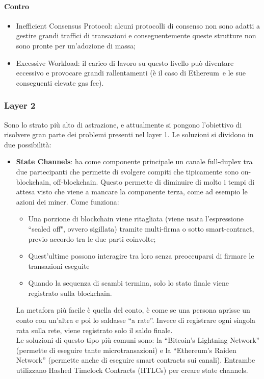     \paragraph{Contro}
    \begin{itemize}
        \item Inefficient Consensus Protocol: alcuni protocolli di consenso non sono adatti a gestire grandi traffici di transazioni e conseguentemente queste strutture non sono pronte per un'adozione di massa;
        \item Excessive Workload: il carico di lavoro su questo livello può diventare eccessivo e provocare grandi rallentamenti (è il caso di Ethereum\glo\ e le sue conseguenti
        elevate gas fee).        
    \end{itemize}

    \subsubsection{Layer 2}
    Sono lo strato più alto di astrazione, e attualmente si pongono l'obiettivo di risolvere gran parte dei problemi presenti nel layer 1. Le soluzioni si dividono in due possibilità:
    \begin{itemize}
        \item \textbf{State Channels}: ha come componente principale un canale full-duplex tra due partecipanti che permette di svolgere compiti che tipicamente sono on-blockchain, off-blockchain. 
        Questo permette di diminuire di molto i tempi di attesa visto che viene a mancare la componente terza, come ad esempio le azioni dei miner\glo.
        Come funziona:
        \begin{itemize}
            \item Una porzione di blockchain viene ritagliata (viene usata l’espressione “sealed off", ovvero sigillata) tramite multi-firma o sotto smart-contract, previo accordo tra le due parti coinvolte;
            \item Quest’ultime possono interagire tra loro senza preoccuparsi di firmare le transazioni eseguite
            \item Quando la sequenza di scambi termina, solo lo stato finale viene registrato sulla blockchain.
        \end{itemize}
        La metafora più facile è quella del conto, è come se una persona aprisse un conto con un’altra e poi lo saldasse “a rate”. Invece di registrare ogni singola rata sulla rete, viene 
        registrato solo il saldo finale.\\
        Le soluzioni di questo tipo più comuni sono: la “Bitcoin’s Lightning Network” (permette di eseguire tante microtransazioni) e la “Ethereum’s Raiden Network” (permette anche di eseguire smart contracts 
        sui canali). Entrambe utilizzano Hashed Timelock Contracts (HTLCs) per creare state channels.
    \end{itemize}
